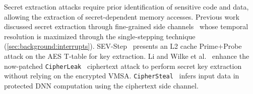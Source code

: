 



\label{sec:relatedwork:extraction}
Secret extraction attacks require prior identification of sensitive code and data, allowing the extraction of secret-dependent memory accesses.
Previous work discussed secret extraction through fine-grained side channels~\cite{ciphersteal,li2022systematic,li2021cipherleaks,sevstep} whose temporal resolution is maximized through the single-stepping technique (\cref{sec:background:interrupts}).
SEV-Step~\cite{sevstep} presents an L2 cache Prime+Probe attack on the AES T-table for key extraction.
Li and Wilke et al.~\cite{li2022systematic} enhance the now-patched \texttt{CipherLeak}~\cite{li2021cipherleaks} ciphertext attack to perform secret key extraction without relying on the encrypted VMSA.
\texttt{CipherSteal}~\cite{ciphersteal} infers input data in protected DNN computation using the ciphertext side channel.

